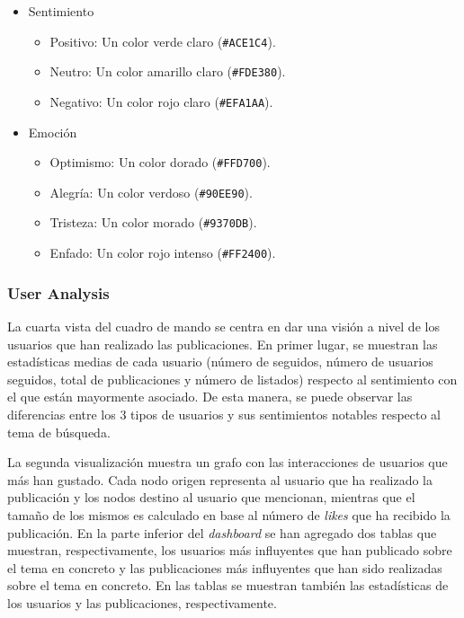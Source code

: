\begin{itemize}
    \item Sentimiento
    \begin{itemize}
        \item Positivo: Un color \colorbox{positive}{verde claro} (\verb|#ACE1C4|).
        \item Neutro: Un color \colorbox{neutral}{amarillo claro} (\verb|#FDE380|).
        \item Negativo: Un color \colorbox{negative}{rojo claro} (\verb|#EFA1AA|).
    \end{itemize}
    
    \item Emoción
    \begin{itemize}
        \item Optimismo: Un color \colorbox{optimism}{dorado} (\verb|#FFD700|).
        \item Alegría: Un color \colorbox{joy}{verdoso} (\verb|#90EE90|).
        \item Tristeza: Un color \colorbox{sadness}{morado} (\verb|#9370DB|).
        \item Enfado: Un color \colorbox{anger}{rojo intenso} (\verb|#FF2400|).
    \end{itemize}
\end{itemize}




\subsubsection{User Analysis}

La cuarta vista del cuadro de mando se centra en dar una visión a nivel de los usuarios que han realizado las publicaciones. En primer lugar, se muestran las estadísticas medias de cada usuario (número de seguidos, número de usuarios seguidos, total de publicaciones y número de listados) respecto al sentimiento con el que están mayormente asociado. De esta manera, se puede observar las diferencias entre los 3 tipos de usuarios y sus sentimientos notables respecto al tema de búsqueda.

La segunda visualización muestra un grafo con las interacciones de usuarios que más han gustado. Cada nodo origen representa al usuario que ha realizado la publicación y los nodos destino al usuario que mencionan, mientras que el tamaño de los mismos es calculado en base al número de \textit{likes} que ha recibido la publicación. En la parte inferior del \textit{dashboard} se han agregado dos tablas que muestran, respectivamente, los usuarios más influyentes que han publicado sobre el tema en concreto y las publicaciones más influyentes que han sido realizadas sobre el tema en concreto. En las tablas se muestran también las estadísticas de los usuarios y las publicaciones, respectivamente.

